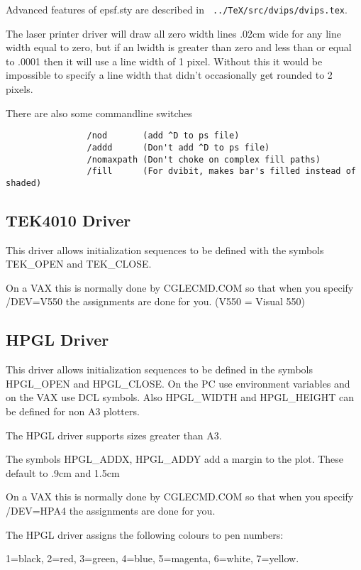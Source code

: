 Advanced features of {\sf epsf.sty} are described in {\tt
../TeX/src/dvips/dvips.tex}.

The laser printer driver will draw all zero width lines .02cm wide
for any line width equal to zero, but if an lwidth 
is greater than zero and less than or equal to .0001 then it will use a line 
width of 1 pixel.  Without this it would be impossible to specify 
a line width that didn't occasionally get rounded to 2 pixels.

There are also some commandline switches
\begin{verbatim}
                /nod       (add ^D to ps file)
                /addd      (Don't add ^D to ps file)
                /nomaxpath (Don't choke on complex fill paths)
                /fill      (For dvibit, makes bar's filled instead of shaded)
\end{verbatim}

\subsection{TEK4010 Driver}
This driver allows initialization sequences to be defined 
with the symbols TEK\_OPEN and TEK\_CLOSE.

On a VAX this is normally done by CGLECMD.COM so that when you
specify /DEV=V550 the assignments are done for you.
(V550 = Visual 550)

 
\subsection{HPGL Driver}
This driver allows initialization sequences to be defined 
in the symbols HPGL\_OPEN and HPGL\_CLOSE.  On the PC 
use environment variables and on the VAX use DCL symbols.
Also HPGL\_WIDTH and HPGL\_HEIGHT can be defined for non A3 plotters.

The HPGL driver supports sizes greater than A3.

The symbols HPGL\_ADDX, HPGL\_ADDY add a margin to the plot.  
These default to .9cm and 1.5cm

On a VAX this is normally done by CGLECMD.COM so that when you
specify /DEV=HPA4 the assignments are done for you.

The HPGL driver assigns the following colours to pen numbers:

1=black, 2=red, 3=green, 4=blue, 5=magenta, 6=white, 7=yellow.

